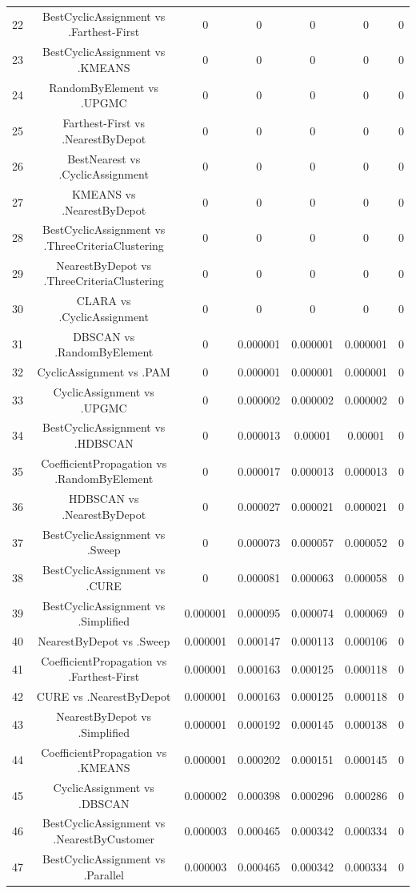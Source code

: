 \documentclass[a4paper,10pt]{article}
\begin{document}
\begin{landscape}
\begin{table}[!htp]
\begin{tabular}{ccccccc}
22&BestCyclicAssignment vs .Farthest-First&0&0&0&0&0\\
23&BestCyclicAssignment vs .KMEANS&0&0&0&0&0\\
24&RandomByElement vs .UPGMC&0&0&0&0&0\\
25&Farthest-First vs .NearestByDepot&0&0&0&0&0\\
26&BestNearest vs .CyclicAssignment&0&0&0&0&0\\
27&KMEANS vs .NearestByDepot&0&0&0&0&0\\
28&BestCyclicAssignment vs .ThreeCriteriaClustering&0&0&0&0&0\\
29&NearestByDepot vs .ThreeCriteriaClustering&0&0&0&0&0\\
30&CLARA vs .CyclicAssignment&0&0&0&0&0\\
31&DBSCAN vs .RandomByElement&0&0.000001&0.000001&0.000001&0\\
32&CyclicAssignment vs .PAM&0&0.000001&0.000001&0.000001&0\\
33&CyclicAssignment vs .UPGMC&0&0.000002&0.000002&0.000002&0\\
34&BestCyclicAssignment vs .HDBSCAN&0&0.000013&0.00001&0.00001&0\\
35&CoefficientPropagation vs .RandomByElement&0&0.000017&0.000013&0.000013&0\\
36&HDBSCAN vs .NearestByDepot&0&0.000027&0.000021&0.000021&0\\
37&BestCyclicAssignment vs .Sweep&0&0.000073&0.000057&0.000052&0\\
38&BestCyclicAssignment vs .CURE&0&0.000081&0.000063&0.000058&0\\
39&BestCyclicAssignment vs .Simplified&0.000001&0.000095&0.000074&0.000069&0\\
40&NearestByDepot vs .Sweep&0.000001&0.000147&0.000113&0.000106&0\\
41&CoefficientPropagation vs .Farthest-First&0.000001&0.000163&0.000125&0.000118&0\\
42&CURE vs .NearestByDepot&0.000001&0.000163&0.000125&0.000118&0\\
43&NearestByDepot vs .Simplified&0.000001&0.000192&0.000145&0.000138&0\\
44&CoefficientPropagation vs .KMEANS&0.000001&0.000202&0.000151&0.000145&0\\
45&CyclicAssignment vs .DBSCAN&0.000002&0.000398&0.000296&0.000286&0\\
46&BestCyclicAssignment vs .NearestByCustomer&0.000003&0.000465&0.000342&0.000334&0\\
47&BestCyclicAssignment vs .Parallel&0.000003&0.000465&0.000342&0.000334&0\\

\end{tabular}
\end{table}
\end{landscape}
\end{document}
